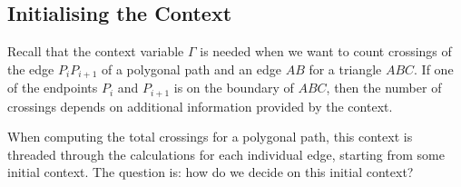 



\subsection{Initialising the Context}\label{sec:ContextInitialisation}
Recall that the context variable $\Gamma$ is needed when we want to count crossings of the edge $P_iP_{i+1}$ of a polygonal path and an edge $AB$ for a triangle $ABC$. If one of the endpoints $P_i$ and $P_{i+1}$ is on the boundary of $ABC$, then the number of crossings depends on additional information provided by the context. 

When computing the total crossings for a polygonal path, this context is threaded through the calculations for each individual edge, starting from some initial context. The question is: how do we decide on this initial context?

